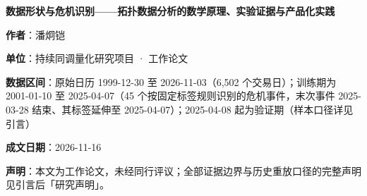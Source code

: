 \documentclass[12pt,a4paper]{ctexart}
\begin{document}
\begin{titlepage}
\vspace*{3cm}
\begin{center}
{\LARGE\bfseries 数据形状与危机识别——拓扑数据分析的数学原理、实验证据与产品化实践\par}
\vspace{2.2cm}
{\normalsize \textbf{作者}：潘炯铠\par\vspace{0.35em}}
{\normalsize \textbf{单位}：持续同调量化研究项目 · 工作论文\par\vspace{0.35em}}
{\normalsize \textbf{数据区间}：原始日历 1999-12-30 至 2026-11-03（6,502 个交易日）；训练期为 2001-01-10 至 2025-04-07（45 个按固定标签规则识别的危机事件，末次事件 2025-03-28 结束、其标签延伸至 2025-04-07）；2025-04-08 起为验证期（样本口径详见引言）\par\vspace{0.35em}}
{\normalsize \textbf{成文日期}：2026-11-16\par\vspace{0.35em}}
\vspace{1.6cm}
\begin{minipage}{0.86\textwidth}\small\setlength{\parindent}{2em}
\textbf{声明}：本文为工作论文，未经同行评议；全部证据边界与历史重放口径的完整声明见引言后「研究声明」。\par
\end{minipage}
\end{center}
\end{titlepage}
\tableofcontents
\newpage
\end{document}
